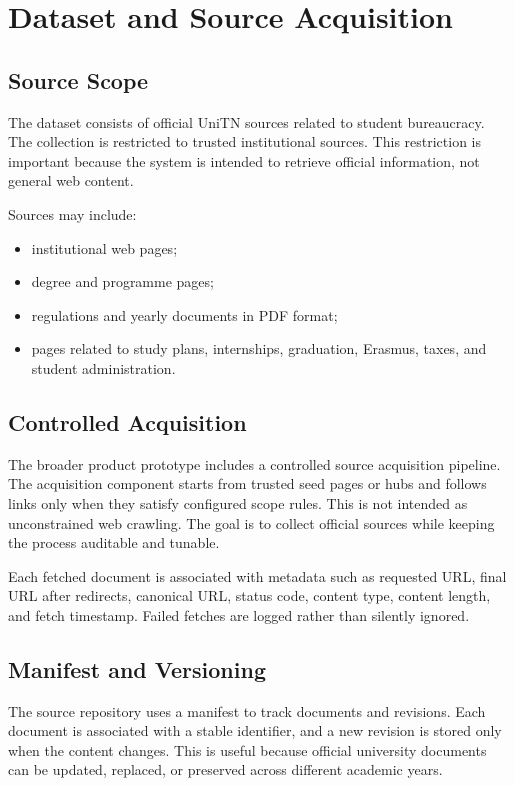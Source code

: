 \chapter{Dataset and Source Acquisition}

\section{Source Scope}
The dataset consists of official UniTN sources related to student bureaucracy. The collection is restricted to trusted institutional sources. This restriction is important because the system is intended to retrieve official information, not general web content.

Sources may include:

\begin{itemize}
    \item institutional web pages;
    \item degree and programme pages;
    \item regulations and yearly documents in PDF format;
    \item pages related to study plans, internships, graduation, Erasmus, taxes, and student administration.
\end{itemize}

\section{Controlled Acquisition}
The broader product prototype includes a controlled source acquisition pipeline. The acquisition component starts from trusted seed pages or hubs and follows links only when they satisfy configured scope rules. This is not intended as unconstrained web crawling. The goal is to collect official sources while keeping the process auditable and tunable.

Each fetched document is associated with metadata such as requested URL, final URL after redirects, canonical URL, status code, content type, content length, and fetch timestamp. Failed fetches are logged rather than silently ignored.

\section{Manifest and Versioning}
The source repository uses a manifest to track documents and revisions. Each document is associated with a stable identifier, and a new revision is stored only when the content changes. This is useful because official university documents can be updated, replaced, or preserved across different academic years.

